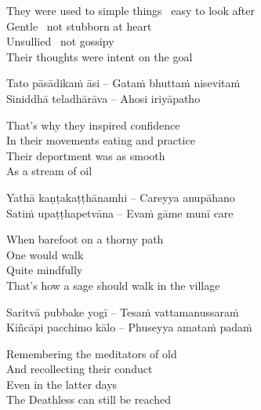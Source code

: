 \begin{english-verses}
  They were used to simple things \breathmark\ easy to look after\\
  Gentle \breathmark\ not stubborn at heart\\
  Unsullied \breathmark\ not gossipy\\
  Their thoughts were intent on the goal
\end{english-verses}

\begin{verses}
  Tato pāsādikaṁ āsi – Gataṁ bhuttaṁ nisevitaṁ\\
  Siniddhā teladhārāva – Ahosi iriyāpatho
\end{verses}

\begin{english-verses}
  That's why they inspired confidence\\
  In their movements eating and practice\\
  Their deportment was as smooth\\
  As a stream of oil
\end{english-verses}

\begin{verses}
  Yathā kaṇṭakaṭṭhānamhi – Careyya anupāhano\\
  Satiṁ upaṭṭhapetvāna – Evaṁ gāme munī care
\end{verses}

\begin{english-verses}
  When barefoot on a thorny path\\
  One would walk\\
  Quite mindfully\\
  That's how a sage should walk in the village
\end{english-verses}

\begin{verses}
  Saritvā pubbake yogī – Tesaṁ vattamanussaraṁ\\
  Kiñcāpi pacchimo kālo – Phuseyya amataṁ padaṁ
\end{verses}

\begin{english-verses}
  Remembering the meditators of old\\
  And recollecting their conduct\\
  Even in the latter days\\
  The Deathless can still be reached
\end{english-verses}

\suttaRef{[Thag 16.10]}

